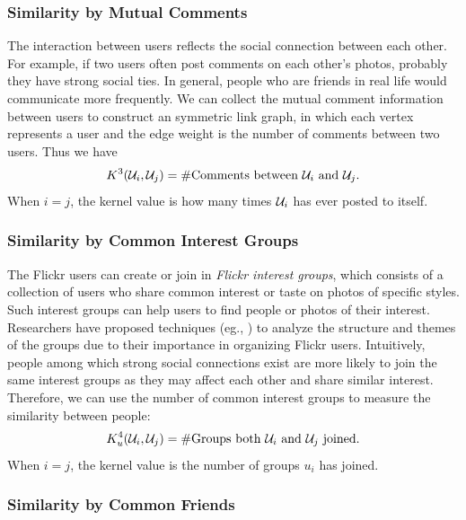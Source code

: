 \subsubsection{Similarity by Mutual Comments}

The interaction between users reflects the social connection between each other. For example, if two users often post comments on each other's photos, probably they have
strong social ties. In general, people who are friends in real life would communicate more frequently. We can collect the mutual comment information between users to construct an symmetric link graph, in which each vertex represents a user and the edge weight is the number of comments between two users. Thus we have
\[
K^3({\cal U}_i, {\cal U}_j)  = \#\mbox{Comments between } {\cal U}_i \mbox{ and } {\cal U}_j.
\]
When $i=j$, the kernel value is how many times ${\cal U}_i$ has ever posted to itself.

\subsubsection{Similarity by Common Interest Groups}

The Flickr users can create or join in {\em Flickr interest groups}, which consists of a collection of users who share common interest or taste on photos of specific styles. Such interest groups can help users to find people or photos of their interest. Researchers have proposed techniques (eg.,
\cite{mm/NegoescuG08,mm/NegoescuAPVG09}) to analyze the structure and themes of the groups due to their importance in organizing Flickr users. Intuitively, people among which strong social connections exist are more likely to join the same interest groups as they may affect each other and share similar interest. Therefore, we can use the number of common interest groups to measure the similarity between people:
\[
K_u^4({\cal U}_i, {\cal U}_j) = \#\mbox{Groups both } {\cal U}_i \mbox{ and } {\cal U}_j \mbox{ joined}.
\]
When $i = j$, the kernel value is the number of groups $u_i$ has joined.

\subsubsection{Similarity by Common Friends}

